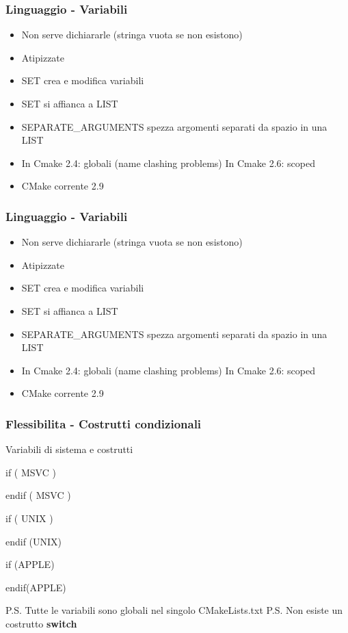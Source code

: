 \documentclass[12pt] {beamer}
\begin{document}

\begin{frame}
	\frametitle{Linguaggio - Variabili}
	\begin{itemize}
		\item Non serve dichiararle (stringa vuota se non esistono)
		\item Atipizzate
		\item SET crea e modifica variabili
		\item SET si affianca a LIST
		\item SEPARATE\_ARGUMENTS spezza argomenti separati da spazio in una LIST
		\item In Cmake 2.4: globali (name clashing problems)  In Cmake 2.6: scoped
		\item CMake corrente 2.9
\end{itemize}
\end{frame}

\begin{frame}
	\frametitle{Linguaggio - Variabili}
	\begin{itemize}
		\item Non serve dichiararle (stringa vuota se non esistono)
		\item Atipizzate
		\item SET crea e modifica variabili
		\item SET si affianca a LIST
		\item SEPARATE\_ARGUMENTS spezza argomenti separati da spazio in una LIST
		\item In Cmake 2.4: globali (name clashing problems)  In Cmake 2.6: scoped
		\item CMake corrente 2.9
\end{itemize}
\end{frame}


\begin{frame}
	\frametitle{Flessibilita - Costrutti condizionali}
	Variabili di sistema e costrutti
	
	\begin{small}
		if ( MSVC )
		
		endif ( MSVC )
		
		if ( UNIX )
		
		endif (UNIX)
		
		if (APPLE)
		
		endif(APPLE)
		
	\end{small}
	P.S. Tutte le variabili sono globali nel singolo CMakeLists.txt
	P.S. Non esiste un costrutto \textbf{switch}
\end{frame}
\end{document}

